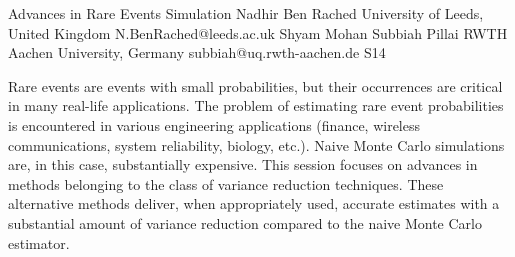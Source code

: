 

\clearpage

\begin{session}
 {Advances in Rare Events Simulation}%
 {Nadhir Ben Rached}%
 {University of Leeds, United Kingdom}%
 {N.BenRached@leeds.ac.uk}%
 {Shyam Mohan Subbiah Pillai}%
 {RWTH Aachen University, Germany}%
 {subbiah@uq.rwth-aachen.de}%
 {S14}%
 {}%

 Rare events are events with small probabilities, but their occurrences are critical in many real-life applications. The problem of estimating rare event probabilities is encountered in various engineering applications (finance, wireless communications, system reliability, biology, etc.). Naive Monte Carlo simulations are, in this case, substantially expensive. This session focuses on advances in methods belonging to the class of variance reduction techniques.  These alternative methods deliver, when appropriately used, accurate estimates with a substantial amount of variance reduction compared to the naive Monte Carlo estimator.
\end{session}



\clearpage

